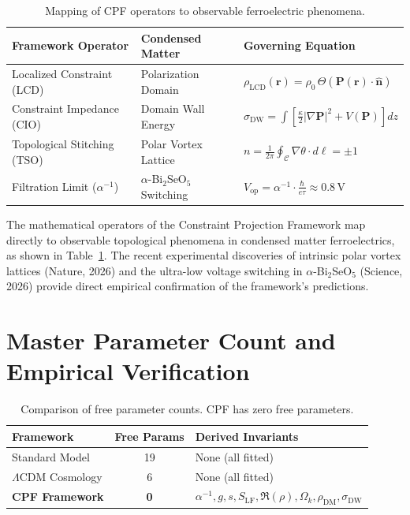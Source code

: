 \documentclass[11pt, a4paper, twocolumn]{article}
\theoremstyle{plain}
\theoremstyle{definition}
\begin{document}
\begin{table}[h]
\centering
\scriptsize
\begin{tabular}{p{2.3cm} p{2.4cm} p{3.2cm}}
\toprule
\textbf{Framework Operator} & \textbf{Condensed Matter} & \textbf{Governing Equation} \\
\midrule
Localized Constraint (LCD) & Polarization Domain & $\rho_{\mathrm{LCD}}(\mathbf{r}) = \rho_0 \, \Theta(\mathbf{P}(\mathbf{r}) \cdot \hat{\mathbf{n}})$ \\
Constraint Impedance (CIO) & Domain Wall Energy & $\sigma_{\mathrm{DW}} = \int \left[\frac{\kappa}{2}|\nabla \mathbf{P}|^2 + V(\mathbf{P})\right] dz$ \\
Topological Stitching (TSO) & Polar Vortex Lattice & $n = \frac{1}{2\pi} \oint_{\mathcal{C}} \nabla \theta \cdot d\boldsymbol{\ell} = \pm 1$ \\
Filtration Limit ($\alpha^{-1}$) & $\alpha$-Bi$_2$SeO$_5$ Switching & $V_{\mathrm{op}} = \alpha^{-1} \cdot \frac{\hbar}{e \tau} \approx 0.8\,\text{V}$ \\
\bottomrule
\end{tabular}
\caption{Mapping of CPF operators to observable ferroelectric phenomena.}
\label{tab:ferro}
\end{table}

The mathematical operators of the Constraint Projection Framework map directly to observable topological phenomena in condensed matter ferroelectrics, as shown in Table~\ref{tab:ferro}. The recent experimental discoveries of intrinsic polar vortex lattices (Nature, 2026) and the ultra-low voltage switching in $\alpha$-Bi$_2$SeO$_5$ (Science, 2026) provide direct empirical confirmation of the framework's predictions.

\section{Master Parameter Count and Empirical Verification}
\label{sec:params}

\begin{table}[h]
\centering
\scriptsize
\begin{tabular}{lcl}
\toprule
\textbf{Framework} & \textbf{Free Params} & \textbf{Derived Invariants} \\
\midrule
Standard Model & 19 & None (all fitted) \\
$\Lambda$CDM Cosmology & 6 & None (all fitted) \\
\textbf{CPF Framework} & \textbf{0} & $\alpha^{-1}, g, s, S_{\mathrm{LF}}, \Re(\rho), \Omega_k, \rho_{\mathrm{DM}}, \sigma_{\mathrm{DW}}$ \\
\bottomrule
\end{tabular}
\caption{Comparison of free parameter counts. CPF has zero free parameters.}
\label{tab:params}
\end{table}
\end{document}
